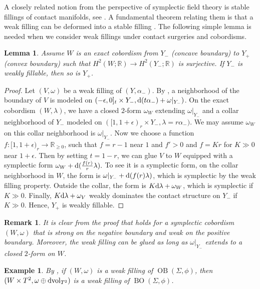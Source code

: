 \documentclass[11pt]{amsart}
\numberwithin{equation}{section}
\newtheorem{lemma}[theorem]{\textbf{Lemma}}
\newtheorem{remark}[theorem]{\textbf{Remark}}
\newtheorem{example}[theorem]{\textbf{Example}}
\def\R{\mathbb{R}}
\def\rd{{\rm d}}
\DeclareMathOperator{\OB}{OB}
\DeclareMathOperator{\BO}{BO}
\begin{document}
A closely related notion from the perspective of symplectic field theory is stable fillings of contact manifolds, see \cite[Definition 1.9]{LW}. A fundamental theorem relating them is that a weak filling can be deformed into a stable filling \cite[Proposition 6]{MNW}. The following simple lemma is needed when we consider weak fillings under contact surgeries and cobordisms. 
\begin{lemma}\label{lemma:weak_surgery}
Assume $W$ is an exact cobordism from $Y_-$ (concave boundary) to $Y_+$ (convex boundary) such that $H^2(W;\R)\to H^2(Y_-;\R)$ is surjective. If $Y_-$ is weakly fillable, then so is $Y_+$.
\end{lemma}
\begin{proof}
Let $(V,\omega)$ be a weak filling of $(Y,\alpha_-)$. By \cite[Lemma 1.6]{MNW}, a neighborhood of the boundary of $V$ is modeled on $(-\epsilon,0]_t\times Y_-, \rd(t\alpha_-)+\omega|_{Y_-})$. On the exact cobordism $(W,\lambda)$, we have a closed $2$-form $\omega_W$ extending $\omega|_{Y_-}$ and a collar neighborhood of $Y_-$ modeled on $([1,1+\epsilon)_r\times Y_-,\lambda = r\alpha_-)$. We may assume $\omega_W$ on this collar neighborhood is $\omega|_{Y_-}$. Now we choose a function $f:[1,1+\epsilon)_r\to \R_{\ge 0}$, such that $f=r-1$ near $1$ and $f'>0$ and $f=Kr$ for $K\gg 0$ near $1+\epsilon$. Then by setting $t=1-r$, we can glue $V$ to $W$ equipped with a symplectic form $\omega_W+\rd(\frac{f(r)}{r}\lambda).$ To see it is a symplectic form, on the collar neighborhood in $W$, the form is $\omega|_{Y_-}+\rd(f(r)\lambda)$, which is symplectic by the weak filling property. Outside the collar, the form is $K\rd \lambda+\omega_W$, which is symplectic if $K\gg 0$. Finally, $K\rd \lambda+\omega_V$ weakly dominates the contact structure on $Y_-$ if $K\gg 0$. Hence, $Y_+$ is weakly fillable.
\end{proof}

\begin{remark}
    It is clear from the proof that  holds for a symplectic cobordism $(W,\omega)$ that is strong on the negative boundary and weak on the positive boundary. Moreover, the weak filling can be glued as long as $\omega|_{Y_-}$ extends to a closed $2$-form on $W$. 
\end{remark}

\begin{example}\label{ex:weak_filling}
By \cite[Theorem A]{zbMATH07162211}, if $(W,\omega)$ is a weak filling of $\OB(\Sigma,\phi)$, then $(W\times T^2, \omega\oplus \rd\mathrm{vol}_{T^2})$ is a weak filling of $\BO(\Sigma,\phi)$.
\end{example}
\end{document}
